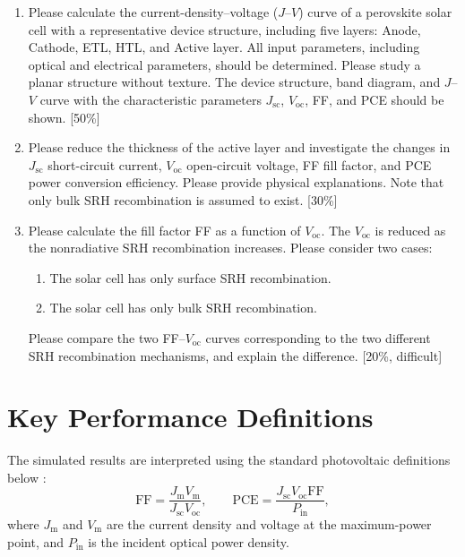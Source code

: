 \documentclass[12pt,a4paper,UTF8]{article}
\begin{document}
\begin{enumerate}[label=\arabic*.]
    \item Please calculate the current-density--voltage (\(J\)--\(V\)) curve of a perovskite solar cell with a representative device structure, including five layers: Anode, Cathode, ETL, HTL, and Active layer. All input parameters, including optical and electrical parameters, should be determined. Please study a planar structure without texture. The device structure, band diagram, and \(J\)--\(V\) curve with the characteristic parameters \(J_{\mathrm{sc}}\), \(V_{\mathrm{oc}}\), FF, and PCE should be shown. \hfill [50\%]

    \item Please reduce the thickness of the active layer and investigate the changes in \(J_{\mathrm{sc}}\) short-circuit current, \(V_{\mathrm{oc}}\) open-circuit voltage, FF fill factor, and PCE power conversion efficiency. Please provide physical explanations. Note that only bulk SRH recombination is assumed to exist. \hfill [30\%]

    \item Please calculate the fill factor FF as a function of \(V_{\mathrm{oc}}\). The \(V_{\mathrm{oc}}\) is reduced as the nonradiative SRH recombination increases. Please consider two cases:
    \begin{enumerate}[label=(\arabic*)]
        \item The solar cell has only surface SRH recombination.
        \item The solar cell has only bulk SRH recombination.
    \end{enumerate}
    Please compare the two FF--\(V_{\mathrm{oc}}\) curves corresponding to the two different SRH recombination mechanisms, and explain the difference. \hfill [20\%, difficult]
\end{enumerate}

\section{Key Performance Definitions}
The simulated results are interpreted using the standard photovoltaic definitions below \cite{nelson2003}:
\begin{equation}
    \mathrm{FF}=\frac{J_\mathrm{m}V_\mathrm{m}}{J_\mathrm{sc}V_\mathrm{oc}},
    \qquad
    \mathrm{PCE}=\frac{J_\mathrm{sc}V_\mathrm{oc}\mathrm{FF}}{P_\mathrm{in}},
    \label{eq:ff-pce}
\end{equation}
where $J_\mathrm{m}$ and $V_\mathrm{m}$ are the current density and voltage at the maximum-power point, and $P_\mathrm{in}$ is the incident optical power density.
\end{document}
